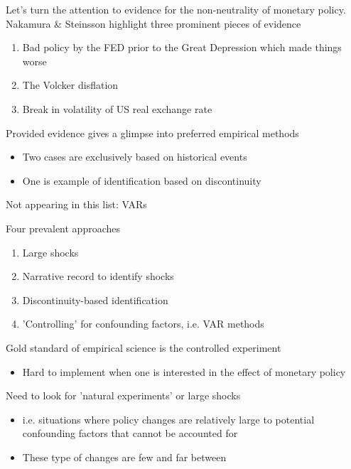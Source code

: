 \documentclass{beamer}
\begin{document}
\begin{frame}
 Let's turn the attention to evidence for the non-neutrality of monetary policy. 
 Nakamura \& Steinsson highlight three prominent pieces of evidence
 \begin{enumerate}
   \item Bad policy by the FED prior to the Great Depression which made things worse
   \item The Volcker disflation
   \item Break in volatility of US real exchange rate
 \end{enumerate} 
\end{frame}

\begin{frame}
  Provided evidence gives a glimpse into preferred empirical methods
  \begin{itemize}
    \item Two cases are exclusively based on historical events
    \item One is example of identification based on discontinuity
  \end{itemize}
  \medskip
  Not appearing in this list: VARs
\end{frame}

\begin{frame}
  Four prevalent approaches
  \begin{enumerate}
    \item Large shocks
    \item Narrative record to identify shocks
    \item Discontinuity-based identification    
    \item 'Controlling' for confounding factors, i.e. VAR methods
  \end{enumerate}
\end{frame}

\begin{frame}
  Gold standard of empirical science is the controlled experiment
  \begin{itemize}
    \item Hard to implement when one is interested in the effect of monetary policy
  \end{itemize}
  \medskip
  Need to look for 'natural experiments' or large shocks
  \begin{itemize}
    \item i.e. situations where policy changes are relatively large to potential confounding factors that cannot be accounted for
    \item These type of changes are few and far between
  \end{itemize}
\end{frame}
\end{document}
